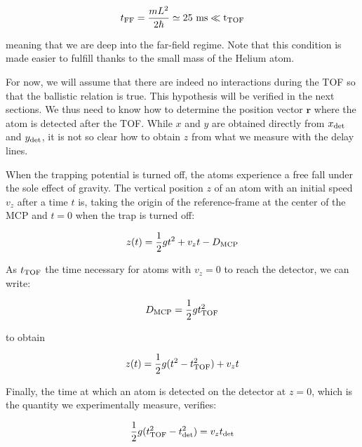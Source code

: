 \begin{equation}
    t_{\rm{FF}} = \frac{mL^2}{2 \hbar} \simeq 25 \ \rm{ms} \ll t_{\rm{TOF}}
\end{equation}

\noindent meaning that we are deep into the far-field regime. Note that this condition is made easier to fulfill thanks to the small mass of the Helium atom. 

For now, we will assume that there are indeed no interactions during the TOF so that the ballistic relation is true. This hypothesis will be verified in the next sections. We thus need to know how to determine the position vector $\bm{r}$ where the atom is detected after the TOF. While $x$ and $y$ are obtained directly from $x_{\rm{det}}$ and $y_{\rm{det}}$, it is not so clear how to obtain $z$ from what we measure with the delay lines.


When the trapping potential is turned off, the atoms experience a free fall under the sole effect of gravity. The vertical position $z$ of an atom with an initial speed $v_z$ after a time $t$ is, taking the origin of the reference-frame at the center of the MCP and $t=0$ when the trap is turned off:

\begin{equation}
    z(t)= \frac{1}{2} gt^2 + v_z t -  D_{\rm{MCP}}
\end{equation}


\noindent As $t_{\rm{TOF}}$ the time necessary for atoms with $v_z=0$ to reach the detector, we can write:

\begin{equation}
    D_{\rm{MCP}} = \frac{1}{2} g t_{\rm{TOF}}^2
\end{equation}

\noindent to obtain

\begin{equation}
     z(t)= \frac{1}{2} g(t^2-t_{\rm{TOF}}^2) + v_z t
\end{equation}


\noindent Finally, the time at which an atom is detected on the detector at $z=0$, which is the quantity we experimentally measure, verifies:

\begin{equation}
    \frac{1}{2} g(t_{\rm{TOF}}^2-t_{\rm{det}}^2) = v_z t_{\rm{det}}
\end{equation}

